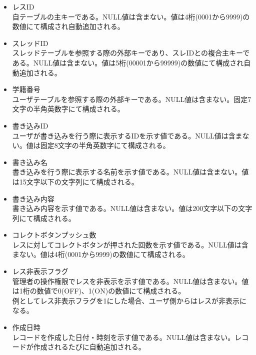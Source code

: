 \documentclass[a4j]{jarticle}
\begin{document}
  \begin{itemize}
  \item レスID\\
    自テーブルの主キーである。NULL値は含まない。値は4桁(0001から9999)の数値にて構成され自動追加される。
  \item スレッドID\\
    スレッドテーブルを参照する際の外部キーであり、スレIDとの複合主キーである。NULL値は含まない。値は5桁(00001から99999)の数値にて構成され自動追加される。
  \item 学籍番号\\
    ユーザテーブルを参照する際の外部キーである。NULL値は含まない。固定7文字の半角英数字にて構成される。\\
  \item 書き込みID\\
    ユーザが書き込みを行う際に表示するIDを示す値である。NULL値は含まない。値は固定8文字の半角英数字にて構成される。\\   
  \item 書き込み名\\
    書き込みを行う際に表示する名前を示す値である。NULL値は含まない。値は15文字以下の文字列にて構成される。\\
  \item 書き込み内容\\
    書き込み内容を示す値である。NULL値は含まない。値は200文字以下の文字列にて構成される。\\
  \item コレクトボタンプッシュ数\\
    レスに対してコレクトボタンが押された回数を示す値である。NULL値は含まない。値は4桁(0001から9999)の数値にて構成される。\\
  \item レス非表示フラグ\\
    管理者の操作権限でレスを非表示を示す値である。NULL値は含まない。値は1桁の数値で0(OFF)、1(ON)の数値にて構成される。\\
    例としてレス非表示フラグを1にした場合、ユーザ側からはレスが非表示になる。
    
  \item 作成日時\\
    レコードを作成した日付・時刻を示す値である。NULL値は含まない。レコードが作成されるたびに自動追加される。    
  \end{itemize}
\end{document}
